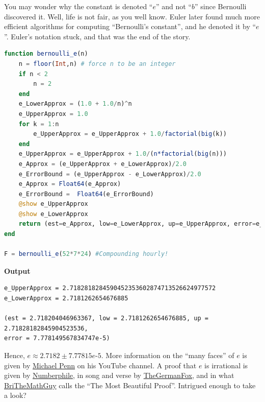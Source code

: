 \begin{rem} You may wonder why the constant is denoted ``$e$'' and not ``$b$'' since Bernoulli discovered it. Well, life is not fair, as you well know. Euler later found much more efficient algorithms for computing ``Bernoulli's constant'', and he denoted it by ``$e$''. Euler's notation stuck, and that was the end of the story. 

\end{rem}

\bigskip

\begin{lstlisting}[language=Julia,style=mystyle]
function bernoulli_e(n)
    n = floor(Int,n) # force n to be an integer
    if n < 2
        n = 2
    end
    e_LowerApprox = (1.0 + 1.0/n)^n
    e_UpperApprox = 1.0
    for k = 1:n
        e_UpperApprox = e_UpperApprox + 1.0/factorial(big(k))
    end
    e_UpperApprox = e_UpperApprox + 1.0/(n*factorial(big(n)))
    e_Approx = (e_UpperApprox + e_LowerApprox)/2.0
    e_ErrorBound = (e_UpperApprox - e_LowerApprox)/2.0
    e_Approx = Float64(e_Approx)
    e_ErrorBound =  Float64(e_ErrorBound)
    @show e_UpperApprox
    @show e_LowerApprox
    return (est=e_Approx, low=e_LowerApprox, up=e_UpperApprox, error=e_ErrorBound) 
end

F = bernoulli_e(52*7*24) #Compounding hourly!
\end{lstlisting}
\textbf{Output} 
\begin{verbatim}
e_UpperApprox = 2.7182818284590452353602874713526624977572
e_LowerApprox = 2.7181262654676885

(est = 2.718204046963367, low = 2.7181262654676885, up = 2.71828182845904523536, 
error = 7.778149567834747e-5)
\end{verbatim}

Hence, $e \approx 2.7182 \pm 7.77815e\text{-}5$. More information on the ``many faces'' of $e$ is given by \href{https://www.youtube.com/shorts/w8w8XtfJVvg}{Michael Penn} on his YouTube channel. A proof that $e$ is irrational is given by \href{https://youtu.be/xOXsDfMMTjs}{Numberphile}, in song and verse by \href{https://youtu.be/8KJtazJMyl0}{TheGermanFox}, and in what \href{https://youtu.be/mP90N_w85XQ}{BriTheMathGuy} calls the ``The Most Beautiful Proof''. Intrigued enough to take a look?

